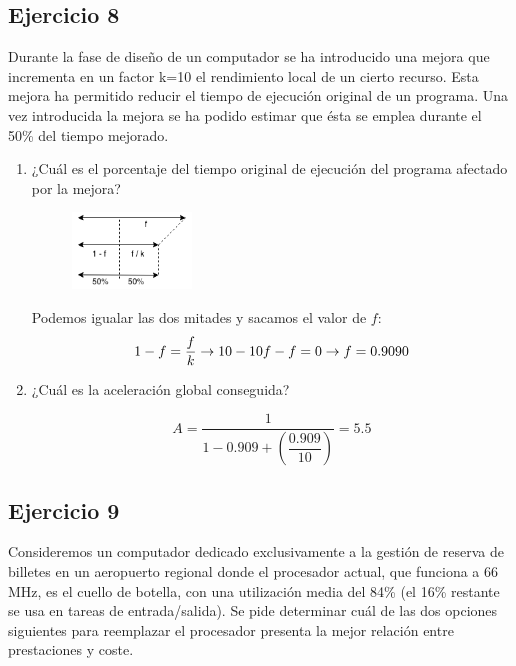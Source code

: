 \subsection{Ejercicio 8}
\noindent
Durante la fase de diseño de un computador se ha introducido una mejora que incrementa en un factor k=10 el rendimiento local de un cierto recurso. Esta mejora ha permitido reducir el tiempo de ejecución original de un programa. Una vez introducida la mejora se ha podido estimar que ésta se emplea durante el 50\% del tiempo mejorado.
\begin{enumerate}
    \item ¿Cuál es el porcentaje del tiempo original de ejecución del programa afectado por la mejora?
\begin{tcolorbox}[colback=white,colframe=cyan!50!black,fonttitle=\bfseries]
\begin{figure}[H]
    \centering
    \includegraphics[width=0.3\textwidth]{Images/18.png}
\end{figure}
Podemos igualar las dos mitades y sacamos el valor de $f$:
\[
1-f=\dfrac{f}{k}\rightarrow 10-10f-f=0\rightarrow f=0.9090
\]
\end{tcolorbox}    
    \item ¿Cuál es la aceleración global conseguida?
\begin{tcolorbox}[colback=white,colframe=cyan!50!black,fonttitle=\bfseries]
\[
A=\dfrac{1}{1-0.909+\left(\dfrac{0.909}{10}\right)}=5.5
\]
\end{tcolorbox}    
\end{enumerate}
\subsection{Ejercicio 9}
\noindent
Consideremos un computador dedicado exclusivamente a la gestión de reserva de billetes en un aeropuerto regional donde el procesador actual, que funciona a 66 MHz, es el cuello de botella, con una utilización media del 84\% (el 16\% restante se usa en tareas de entrada/salida). Se pide determinar cuál de las dos opciones siguientes para reemplazar el procesador presenta la mejor relación entre prestaciones y coste.\\

